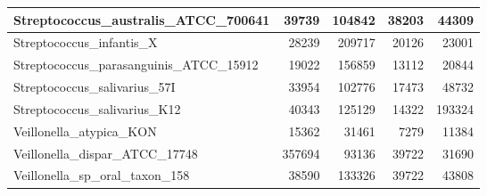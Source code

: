 \documentclass[12pt,a4paper]{article}
\begin{document}
\begin{table}[ht]
\begin{center}
\begin{tabular}{|l*{4}{|r}|}
Streptococcus\_australis\_ATCC\_700641 & 39739 & 104842 & 38203 & 44309 \\ \hline
Streptococcus\_infantis\_X & 28239 & 209717 & 20126 & 23001 \\ \hline
Streptococcus\_parasanguinis\_ATCC\_15912 & 19022 & 156859 & 13112 & 20844 \\ \hline
Streptococcus\_salivarius\_57I & 33954 & 102776 & 17473 & 48732 \\ \hline
Streptococcus\_salivarius\_K12 & 40343 & 125129 & 14322 & 193324 \\ \hline
Veillonella\_atypica\_KON & 15362 & 31461 & 7279 & 11384 \\ \hline
Veillonella\_dispar\_ATCC\_17748 & 357694 & 93136 & 39722 & 31690 \\ \hline
Veillonella\_sp\_oral\_taxon\_158 & 38590 & 133326 & 39722 & 43808 \\ \hline
\end{tabular}
\end{center}
\end{table}
\end{document}
